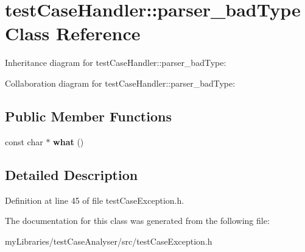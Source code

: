 \hypertarget{classtestCaseHandler_1_1parser__badType}{}\section{test\+Case\+Handler\+::parser\+\_\+bad\+Type Class Reference}
\label{classtestCaseHandler_1_1parser__badType}


Inheritance diagram for test\+Case\+Handler\+::parser\+\_\+bad\+Type\+:


Collaboration diagram for test\+Case\+Handler\+::parser\+\_\+bad\+Type\+:
\subsection*{Public Member Functions}
\begin{DoxyCompactItemize}
\item 
\mbox{\label{classtestCaseHandler_1_1parser__badType_a36e51f6818598615b174fa60b1607727}} 
const char $\ast$ {\bfseries what} ()
\end{DoxyCompactItemize}


\subsection{Detailed Description}


Definition at line 45 of file test\+Case\+Exception.\+h.



The documentation for this class was generated from the following file\+:\begin{DoxyCompactItemize}
\item 
my\+Libraries/test\+Case\+Analyser/src/test\+Case\+Exception.\+h\end{DoxyCompactItemize}
